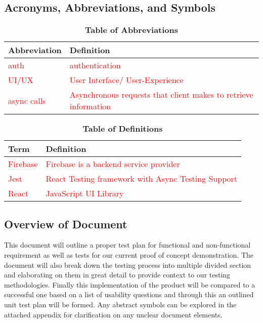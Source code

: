 \documentclass[12pt, titlepage]{article}
\begin{document}
\subsection{Acronyms, Abbreviations, and Symbols}
	
\begin{table}[!htbp]
\caption{\textbf{Table of Abbreviations}} \label{Table}

\begin{tabularx}{\textwidth}{p{3cm}X}
\toprule
\textbf{Abbreviation} & \textbf{Definition} \\
\midrule
\textcolor{red}{auth} & \textcolor{red}{authentication}\\
\textcolor{red}{UI/UX} & \textcolor{red}{User Interface/ User-Experience}\\
\textcolor{red}{async calls} & \textcolor{red}{Asynchronous requests that client makes to retrieve information}\\
\bottomrule
\end{tabularx}

\end{table}

\begin{table}[!htbp]
\caption{\textbf{Table of Definitions}} \label{Table}

\begin{tabularx}{\textwidth}{p{3cm}X}
\toprule
\textbf{Term} & \textbf{Definition}\\
\midrule
\textcolor{red}{Firebase} & \textcolor{red}{Firebase is a backend service provider}\\
\textcolor{red}{Jest} & \textcolor{red}{React Testing framework with Async Testing Support}\\
\textcolor{red}{React} & \textcolor{red}{JavaScript UI Library}\\
\bottomrule
\end{tabularx}

\end{table}	

\subsection{Overview of Document}
This document will outline a proper test plan for functional and non-functional requirement as well as tests for our current proof of concept demonstration. The document will also break down the testing process into multiple divided section and elaborating on them in great detail to provide context to our testing methodologies. Finally this implementation of the product will be compared to a successful one based on a list of usability questions and through this an outlined unit test plan will be formed. Any abstract symbols can be explored in the attached appendix for clarification on any unclear document elements.
\end{document}
